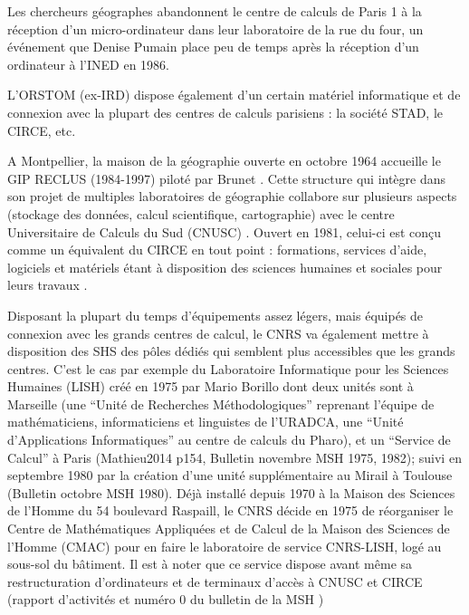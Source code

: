 Les chercheurs géographes abandonnent le centre de calculs de Paris 1 à la réception d'un micro-ordinateur dans leur laboratoire de la rue du four, un événement que Denise Pumain place peu de temps après la réception d'un ordinateur à l'INED en 1986. 

L’ORSTOM (ex-IRD) dispose également d’un certain matériel informatique et de connexion avec la plupart des centres de calculs parisiens : la société STAD, le CIRCE, etc. \autocite{Dejardin1992}

A Montpellier, la maison de la géographie ouverte en octobre 1964 accueille le GIP RECLUS (1984-1997) piloté par Brunet \autocite{Brunet1988}. Cette structure qui intègre dans son projet de multiples laboratoires de géographie collabore sur plusieurs aspects (stockage des données, calcul scientifique, cartographie) avec le centre Universitaire de Calculs du Sud (CNUSC) \autocite{Waniez2010}. Ouvert en 1981, celui-ci est conçu comme un équivalent du CIRCE en tout point : formations, services d’aide, logiciels et matériels étant à disposition des sciences humaines et sociales pour leurs travaux  .

Disposant la plupart du temps d'équipements assez légers, mais équipés de connexion avec les grands centres de calcul, le CNRS va également mettre à disposition des SHS des pôles dédiés qui semblent plus accessibles que les grands centres. C’est le cas par exemple du Laboratoire Informatique pour les Sciences Humaines (LISH) \autocite{MSH1975} créé en 1975 par Mario Borillo dont deux unités sont à Marseille (une \enquote{Unité de Recherches Méthodologiques} reprenant l'équipe de mathématiciens, informaticiens et linguistes de l'URADCA, une \enquote{Unité d’Applications Informatiques} au centre de calculs du Pharo), et un \enquote{Service de Calcul} à Paris (Mathieu2014 p154, Bulletin novembre MSH 1975, 1982); suivi en septembre 1980 par la création d’une unité supplémentaire au Mirail à Toulouse (Bulletin octobre MSH 1980). Déjà installé depuis 1970 à la Maison des Sciences de l'Homme du 54 boulevard Raspaill, le CNRS décide en 1975 de réorganiser le Centre de Mathématiques Appliquées et de Calcul de la Maison des Sciences de l’Homme (CMAC) pour en faire le laboratoire de service CNRS-LISH, logé au sous-sol du bâtiment. Il est à noter que ce service dispose avant même sa restructuration d’ordinateurs et de terminaux d’accès à CNUSC et CIRCE (rapport d’activités \autocite{CNRS1972} et numéro 0 du bulletin de la MSH \autocite{MSH1973})

